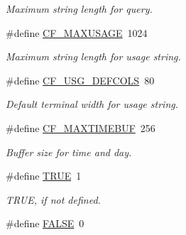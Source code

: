 \begin{CompactItemize}
\begin{CompactList}\small\item\em Maximum string length for query. \item\end{CompactList}\item 
\hypertarget{group__cflib__core_gd36d92b5077988734cdfeb0f47c0488e}{
\#define \hyperlink{group__cflib__core_gd36d92b5077988734cdfeb0f47c0488e}{CF\_\-MAXUSAGE}~1024}
\label{group__cflib__core_gd36d92b5077988734cdfeb0f47c0488e}

\begin{CompactList}\small\item\em Maximum string length for usage string. \item\end{CompactList}\item 
\hypertarget{group__cflib__core_gc568df32f08baaff9c162521856c3ec7}{
\#define \hyperlink{group__cflib__core_gc568df32f08baaff9c162521856c3ec7}{CF\_\-USG\_\-DEFCOLS}~80}
\label{group__cflib__core_gc568df32f08baaff9c162521856c3ec7}

\begin{CompactList}\small\item\em Default terminal width for usage string. \item\end{CompactList}\item 
\hypertarget{group__cflib__core_g582af337c870e7eb2cdb133fd5cc72d2}{
\#define \hyperlink{group__cflib__core_g582af337c870e7eb2cdb133fd5cc72d2}{CF\_\-MAXTIMEBUF}~256}
\label{group__cflib__core_g582af337c870e7eb2cdb133fd5cc72d2}

\begin{CompactList}\small\item\em Buffer size for time and day. \item\end{CompactList}\item 
\hypertarget{group__cflib__core_ga8cecfc5c5c054d2875c03e77b7be15d}{
\#define \hyperlink{group__cflib__core_ga8cecfc5c5c054d2875c03e77b7be15d}{TRUE}~1}
\label{group__cflib__core_ga8cecfc5c5c054d2875c03e77b7be15d}

\begin{CompactList}\small\item\em TRUE, if not defined. \item\end{CompactList}\item 
\hypertarget{group__cflib__core_ga93f0eb578d23995850d61f7d61c55c1}{
\#define \hyperlink{group__cflib__core_ga93f0eb578d23995850d61f7d61c55c1}{FALSE}~0}
\label{group__cflib__core_ga93f0eb578d23995850d61f7d61c55c1}


\end{CompactItemize}
